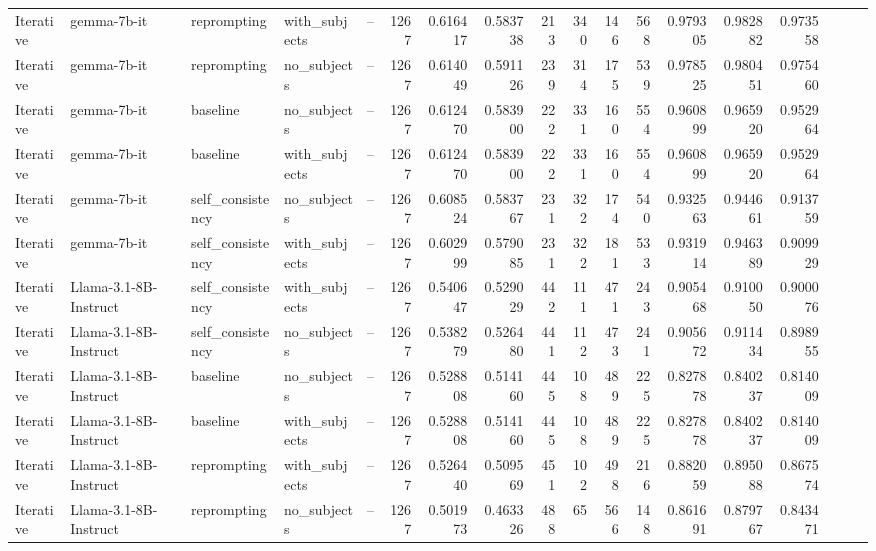 \begin{landscape}
\begin{longtable}{l P{2.9cm} P{4cm} l P{2.2cm} r r r r r r r r r r r r r}
\midrule
Iterative & gemma-7b-it & reprompting & with\_subjects & -- & 1267 & 0.616417 & 0.583738 & 213 & 340 & 146 & 568 & 0.979305 & 0.982882 & 0.973558\\
Iterative & gemma-7b-it & reprompting & no\_subjects & -- & 1267 & 0.614049 & 0.591126 & 239 & 314 & 175 & 539 & 0.978525 & 0.980451 & 0.975460\\
Iterative & gemma-7b-it & baseline & no\_subjects & -- & 1267 & 0.612470 & 0.583900 & 222 & 331 & 160 & 554 & 0.960899 & 0.965920 & 0.952964\\
Iterative & gemma-7b-it & baseline & with\_subjects & -- & 1267 & 0.612470 & 0.583900 & 222 & 331 & 160 & 554 & 0.960899 & 0.965920 & 0.952964\\
Iterative & gemma-7b-it & self\_consistency & no\_subjects & -- & 1267 & 0.608524 & 0.583767 & 231 & 322 & 174 & 540 & 0.932563 & 0.944661 & 0.913759\\
Iterative & gemma-7b-it & self\_consistency & with\_subjects & -- & 1267 & 0.602999 & 0.579085 & 231 & 322 & 181 & 533 & 0.931914 & 0.946389 & 0.909929\\
Iterative & Llama-3.1-8B-Instruct & self\_consistency & with\_subjects & -- & 1267 & 0.540647 & 0.529029 & 442 & 111 & 471 & 243 & 0.905468 & 0.910050 & 0.900076\\
Iterative & Llama-3.1-8B-Instruct & self\_consistency & no\_subjects & -- & 1267 & 0.538279 & 0.526480 & 441 & 112 & 473 & 241 & 0.905672 & 0.911434 & 0.898955\\
Iterative & Llama-3.1-8B-Instruct & baseline & no\_subjects & -- & 1267 & 0.528808 & 0.514160 & 445 & 108 & 489 & 225 & 0.827878 & 0.840237 & 0.814009\\
Iterative & Llama-3.1-8B-Instruct & baseline & with\_subjects & -- & 1267 & 0.528808 & 0.514160 & 445 & 108 & 489 & 225 & 0.827878 & 0.840237 & 0.814009\\
Iterative & Llama-3.1-8B-Instruct & reprompting & with\_subjects & -- & 1267 & 0.526440 & 0.509569 & 451 & 102 & 498 & 216 & 0.882059 & 0.895088 & 0.867574\\
Iterative & Llama-3.1-8B-Instruct & reprompting & no\_subjects & -- & 1267 & 0.501973 & 0.463326 & 488 & 65 & 566 & 148 & 0.861691 & 0.879767 & 0.843471\\


\end{longtable}
\end{landscape}
